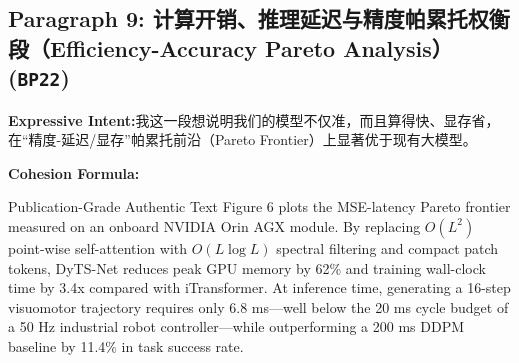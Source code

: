 \subsection*{Paragraph 9: 计算开销、推理延迟与精度帕累托权衡段（Efficiency-Accuracy Pareto Analysis） (\texttt{BP22})}
\noindent\textbf{Expressive Intent:}\enspace 我这一段想说明我们的模型不仅准，而且算得快、显存省，在“精度-延迟/显存”帕累托前沿（Pareto Frontier）上显著优于现有大模型。\par
\noindent\textbf{Cohesion Formula:}\par\vspace{4pt}
\begin{ExampleBox}{Publication-Grade Authentic Text}
Figure 6 plots the MSE-latency Pareto frontier measured on an onboard NVIDIA Orin AGX module. By replacing $O(L^2)$ point-wise self-attention with $O(L \log L)$ spectral filtering and compact patch tokens, DyTS-Net reduces peak GPU memory by 62\% and training wall-clock time by 3.4x compared with iTransformer. At inference time, generating a 16-step visuomotor trajectory requires only 6.8 ms---well below the 20 ms cycle budget of a 50 Hz industrial robot controller---while outperforming a 200 ms DDPM baseline by 11.4\% in task success rate.
\end{ExampleBox}
